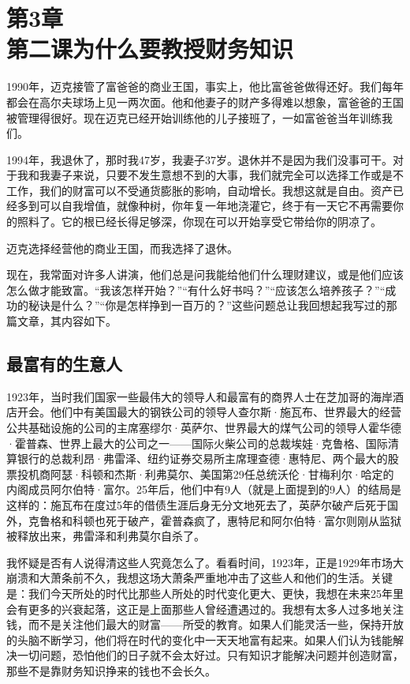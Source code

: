 \section[第3章\q 第二课\q 为什么要教授财务知识]{第3章\\第二课\q 为什么要教授财务知识}

1990年，迈克接管了富爸爸的商业王国，事实上，他比富爸爸做得还好。我们每年都会在高尔夫球场上见一两次面。他和他妻子的财产多得难以想象，富爸爸的王国被管理得很好。现在迈克已经开始训练他的儿子接班了，一如富爸爸当年训练我们。

1994年，我退休了，那时我47岁，我妻子37岁。退休并不是因为我们没事可干。对于我和我妻子来说，只要不发生意想不到的大事，我们就完全可以选择工作或是不工作，我们的财富可以不受通货膨胀的影响，自动增长。我想这就是自由。资产已经多到可以自我增值，就像种树，你年复一年地浇灌它，终于有一天它不再需要你的照料了。它的根已经长得足够深，你现在可以开始享受它带给你的阴凉了。

迈克选择经营他的商业王国，而我选择了退休。

现在，我常面对许多人讲演，他们总是问我能给他们什么理财建议，或是他们应该怎么做才能致富。“我该怎样开始？”“有什么好书吗？”“应该怎么培养孩子？”“成功的秘诀是什么？”“你是怎样挣到一百万的？”这些问题总让我回想起我写过的那篇文章，其内容如下。

\subsection*{最富有的生意人}

1923年，当时我们国家一些最伟大的领导人和最富有的商界人士在芝加哥的海岸酒店开会。他们中有美国最大的钢铁公司的领导人查尔斯·施瓦布、世界最大的经营公共基础设施的公司的主席塞缪尔·英萨尔、世界最大的煤气公司的领导人霍华德·霍普森、世界上最大的公司之一——国际火柴公司的总裁埃娃·克鲁格、国际清算银行的总裁利昂·弗雷泽、纽约证券交易所主席理查德·惠特尼、两个最大的股票投机商阿瑟·科顿和杰斯·利弗莫尔、美国第29任总统沃伦·甘梅利尔·哈定的内阁成员阿尔伯特·富尔。25年后，他们中有9人（就是上面提到的9人）的结局是这样的：施瓦布在度过5年的借债生涯后身无分文地死去了，英萨尔破产后死于国外，克鲁格和科顿也死于破产，霍普森疯了，惠特尼和阿尔伯特·富尔则刚从监狱被释放出来，弗雷泽和利弗莫尔自杀了。

我怀疑是否有人说得清这些人究竟怎么了。看看时间，1923年，正是1929年市场大崩溃和大萧条前不久，我想这场大萧条严重地冲击了这些人和他们的生活。关键是：我们今天所处的时代比那些人所处的时代变化更大、更快，我想在未来25年里会有更多的兴衰起落，这正是上面那些人曾经遭遇过的。我想有太多人过多地关注钱，而不是关注他们最大的财富——所受的教育。如果人们能灵活一些，保持开放的头脑不断学习，他们将在时代的变化中一天天地富有起来。如果人们认为钱能解决一切问题，恐怕他们的日子就不会太好过。只有知识才能解决问题并创造财富，那些不是靠财务知识挣来的钱也不会长久。

